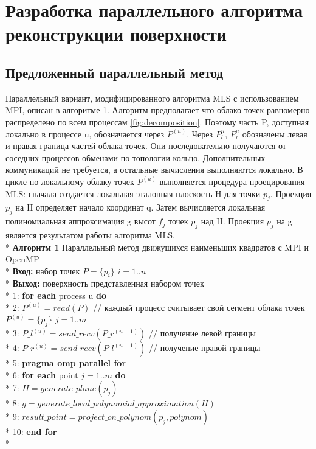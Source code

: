 \section{Разработка параллельного алгоритма реконструкции поверхности}
\subsection{Предложенный параллельный метод}
Параллельный вариант, модифицированного алгоритма MLS с использованием MPI, описан в алгоритме 1. Алгоритм предполагает что облако точек равномерно распределено по всем процессам \ref{fig:decomposition}. Поэтому часть P, доступная локально в процессе u, обозначается через $P^{(u)}$. Через $P_l^{u}$, $P_r^{u}$ обозначены левая и правая граница частей облака точек. Они последовательно получаются от соседних процессов обменами по топологии кольцо. Дополнительных коммуникаций не требуется, а остальные вычисления выполняются локально. В цикле по локальному облаку точек $P^{(u)}$ выполняется процедура проецирования MLS: сначала создается локальная эталонная плоскость H для точки $p_j$. Проекция $p_j$ на H определяет начало координат q. Затем вычисляется локальная полиномиальная аппроксимация g высот $f_j$ точек $p_j$ над H. Проекция $p_j$ на g является результатом работы алгоритма MLS. \\*
\textbf{Алгоритм 1}  Параллельный метод движущихся наименьших квадратов с MPI и OpenMP \\*
\textbf{Вход:} набор точек $P = \{p_i\}$ $i = 1..n$ \\*
\textbf{Выход:} поверхность представленная набором точек \\*
1: \textbf{for each} process u \textbf{do} \\*
2: \quad $P^{(u)} = read(P)$ // каждый процесс считывает свой сегмент облака точек $P^{(u)} = \{p_j\}$ $j = 1..m$ \\*
3: \quad $P\_l^{(u)} = send\_recv(P\_r^{(u-1)})$ // получение левой границы\\* 
4: \quad $P\_r^{(u)} = send\_recv(P\_l^{(u+1)})$ // получение правой границы\\*
5: \quad\textbf{pragma omp parallel for} \\*
6: \quad\textbf{for each} point $j = 1..m $ \textbf{do}\\*
7: \quad\quad$H = generate\_plane(p_j)$ \\*
8: \quad\quad$g = generate\_local\_polynomial\_approximation(H)$ \\*
9: \quad\quad$result\_point = project\_on\_polynom(p_j, polynom)$ \\*
10: \quad\textbf{end for} \\*

